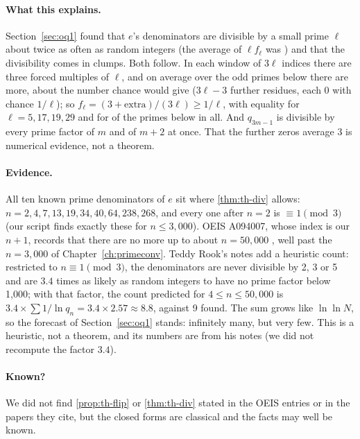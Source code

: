 \paragraph{What this explains.} Section~\ref{sec:oq1} found that $e$'s denominators are divisible by a small prime $\ell$ about twice as often as random integers (the average of $\ell f_\ell$ was \OqEavg) and that the divisibility comes in clumps. Both follow. In each window of $3\ell$ indices there are three forced multiples of $\ell$, and on average over the \ThEnprimes{} odd primes below \ThElim{} there are \ThEextra{} more, about the number chance would give ($3\ell - 3$ further residues, each $0$ with chance $1/\ell$); so $f_\ell = (3 + \text{extra})/(3\ell) \ge 1/\ell$, with equality for $\ell = 5, 17, 19, 29$ and for \ThEzeroextra{} of the primes below \ThElim{} in all. And $q_{3m-1}$ is divisible by every prime factor of $m$ and of $m + 2$ at once. That the further zeros average 3 is numerical evidence, not a theorem.

\paragraph{Evidence.} All ten known prime denominators of $e$ sit where \cref{thm:th-div} allows: $n = 2, 4, 7, 13, 19, 34, 40, 64, 238, 268$, and every one after $n = 2$ is $\equiv 1 \pmod 3$ (our script finds exactly these for $n \le 3{,}000$). OEIS A094007, whose index is our $n + 1$, records that there are no more up to about $n = 50{,}000$ \citep{OEIS_A094007}, well past the $n = 3{,}000$ of Chapter~\ref{ch:primeconv}. Teddy Rook's notes add a heuristic count: restricted to $n \equiv 1 \pmod 3$, the denominators are never divisible by 2, 3 or 5 and are $3.4$ times as likely as random integers to have no prime factor below 1{,}000; with that factor, the count predicted for $4 \le n \le 50{,}000$ is $3.4 \times \sum 1/\ln q_n = 3.4 \times 2.57 \approx 8.8$, against 9 found. The sum grows like $\ln\ln N$, so the forecast of Section~\ref{sec:oq1} stands: infinitely many, but very few. This is a heuristic, not a theorem, and its numbers are from his notes (we did not recompute the factor $3.4$).

\paragraph{Known?} We did not find \cref{prop:th-flip} or \cref{thm:th-div} stated in the OEIS entries or in the papers they cite, but the closed forms are classical and the facts may well be known.

